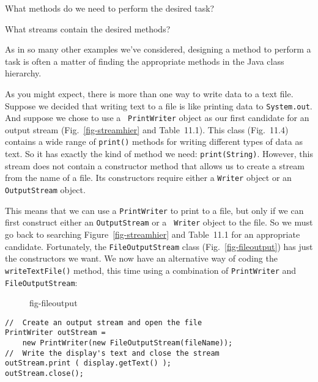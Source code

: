 \begin{BL}
\item  What methods do we need to perform the desired task?
\item  What streams contain the desired methods?
\end{BL}

\noindent As in so many other examples we've considered,
designing a method to perform a task is often a matter of finding the
appropriate methods in the Java class hierarchy.


\noindent As you might expect, there is more than one way to write data to a
text file.  Suppose we decided that writing text to a file is like
printing data to {\tt System.out}.  And suppose we chose to use a {\tt
PrintWriter} object as our first candidate for an output stream
(Fig.~\ref{fig-streamhier} and Table~11.1). This class
(Fig.~11\mbox{.}4) contains a wide range of {\tt print()} methods
for writing different types of data as text.  So it has exactly the
kind of method we need: {\tt print(String)}.  However, this stream
does not contain a constructor method that allows us to create a
stream from the name of a file.  Its constructors require either a
{\tt Writer} object or an {\tt OutputStream} object.

This means that we can use a {\tt PrintWriter} to print to a file, but
only if we can first construct either an {\tt OutputStream} or a {\tt
Writer} object to the file.  So we must go back to searching
Figure~\ref{fig-streamhier} and Table~11.1 for an
appropriate candidate.  Fortunately, the {\tt FileOutputStream} class
(Fig.~\ref{fig-fileoutput}) has just the constructors we want.
We now have an alternative way of coding the {\tt writeTextFile()}
method, this time using a combination of {\tt PrintWriter} and
{\tt FileOutputStream}:
\begin{figure}[t]
 {fig-fileoutput}
\end{figure}


\begin{jjjlisting}
\begin{lstlisting}
//  Create an output stream and open the file
PrintWriter outStream = 
    new PrintWriter(new FileOutputStream(fileName)); 
//  Write the display's text and close the stream
outStream.print ( display.getText() );       
outStream.close(); 
\end{lstlisting}
\end{jjjlisting}


